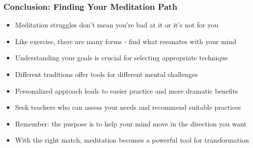 \begin{frame}[fragile]\frametitle{Conclusion: Finding Your Meditation Path}
      \begin{itemize}
	\item Meditation struggles don't mean you're bad at it or it's not for you
	\item Like exercise, there are many forms - find what resonates with your mind
	\item Understanding your goals is crucial for selecting appropriate technique
	\item Different traditions offer tools for different mental challenges
	\item Personalized approach leads to easier practice and more dramatic benefits
	\item Seek teachers who can assess your needs and recommend suitable practices
	\item Remember: the purpose is to help your mind move in the direction you want
	\item With the right match, meditation becomes a powerful tool for transformation
	  \end{itemize}
\end{frame}